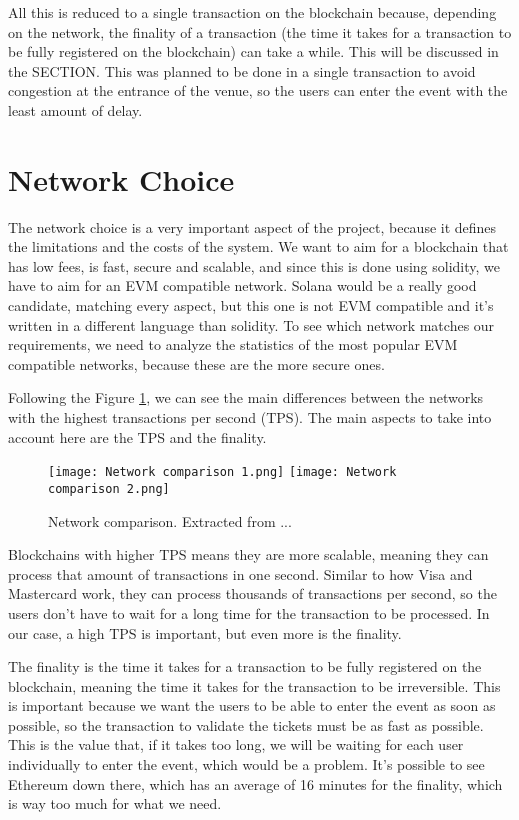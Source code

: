 All this is reduced to a single transaction on the blockchain because, depending on the network, the finality of a transaction (the time it takes for a transaction to be fully registered on the blockchain) can take a while. This will be discussed in the SECTION. This was planned to be done in a single transaction to avoid congestion at the entrance of the venue, so the users can enter the event with the least amount of delay.

\section{Network Choice}
\label{sec:network_choice}

The network choice is a very important aspect of the project, because it defines the limitations and the costs of the system. We want to aim for a blockchain that has low fees, is fast, secure and scalable, and since this is done using solidity, we have to aim for an EVM compatible network. Solana would be a really good candidate, matching every aspect, but this one is not EVM compatible and it's written in a different language than solidity. To see which network matches our requirements, we need to analyze the statistics of the most popular EVM compatible networks, because these are the more secure ones.

Following the Figure \ref{fig:network_comparison}, we can see the main differences between the networks with the highest transactions per second (TPS). The main aspects to take into account here are the TPS and the finality.

\begin{figure}[H]
    \texttt{[image: Network comparison 1.png]}
    \texttt{[image: Network comparison 2.png]}
    \centering
    \caption{Network comparison. Extracted from ...}
    \label{fig:network_comparison}
\end{figure}

Blockchains with higher TPS means they are more scalable, meaning they can process that amount of transactions in one second. Similar to how Visa and Mastercard work, they can process thousands of transactions per second, so the users don't have to wait for a long time for the transaction to be processed. In our case, a high TPS is important, but even more is the finality.

The finality is the time it takes for a transaction to be fully registered on the blockchain, meaning the time it takes for the transaction to be irreversible. This is important because we want the users to be able to enter the event as soon as possible, so the transaction to validate the tickets must be as fast as possible. This is the value that, if it takes too long, we will be waiting for each user individually to enter the event, which would be a problem. It's possible to see Ethereum down there, which has an average of 16 minutes for the finality, which is way too much for what we need.

